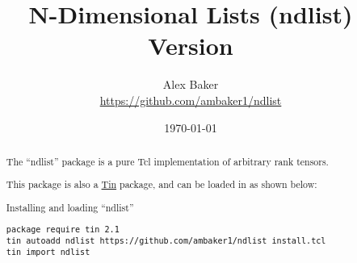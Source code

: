 \documentclass{article}
\title{\Huge{N-Dimensional Lists (ndlist)}\\\large Version \version}
\author{Alex Baker\\\small\url{https://github.com/ambaker1/ndlist}}
\date{\small\today}
\begin{document}
\maketitle
\begin{abstract}
\begin{center}
The ``ndlist'' package is a pure Tcl implementation of arbitrary rank tensors.

This package is also a \textcolor{blue}{\href{https://github.com/ambaker1/Tin}{Tin}} package, and can be loaded in as shown below:
\end{center}
\begin{example}{Installing and loading ``ndlist''}
\begin{lstlisting}
package require tin 2.1
tin autoadd ndlist https://github.com/ambaker1/ndlist install.tcl
tin import ndlist
\end{lstlisting}
\end{example}
\end{abstract}
\clearpage









\printindex
\end{document}
